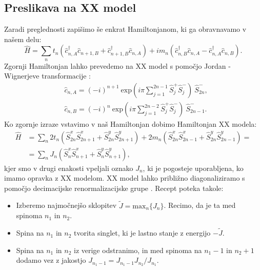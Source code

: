 \cleardoublepage
\renewcommand\appendixname{Dodatek}
\begin{appendices}
\chapter{Preslikava na XX model}
Zaradi preglednosti zapišimo še enkrat Hamiltonjanom, ki ga obravnavamo v našem delu:
\begin{equation}
\hat{H} = \sum_{n} t_n \left(\hat{c}_{n,A}^\dagger \hat{c}_{n+1, B} + \hat{c}^\dagger_{n+1,B} \hat{c}_{n,A} \right) + im_n \left( \hat{c}^\dagger_{n,B} \hat{c}_{n,A} - \hat{c}^\dagger_{n,A}\hat{c}_{n,B}   \right).
\end{equation}
Zgornji Hamiltonjan lahko prevedemo na XX model s pomočjo Jordan - Wignerjeve transformacije \cite{mondragon}:
\begin{align}
&\hat{c}_{n,A} = (-i)^{n+1}\  \mathrm{exp}(i \pi \sum_{j=1}^{2n-1} \hat{S}_j^+ \hat{S}_j^-)\ \hat{S}_{2n}^-,\\
&\hat{c}_{n,B} = (-i)^n \ \mathrm{exp}(i \pi \sum_{j=1}^{2n-2} \hat{S}_j^+ \hat{S}_j^-) \ \hat{S}^-_{2n-1}.
\end{align}
Ko zgornje izraze vstavimo v naš Hamiltonjan dobimo Hamiltonjan XX modela:
\begin{align}
\hat{H} &= \sum_n 2 t_n ( \hat{S}^x_{2n} \hat{S}^x_{2n+1} + \hat{S}^y_{2n} \hat{S}^y_{2n+1}) + 2m_n (\hat{S}^x_{2n} \hat{S}^x_{2n-1} + \hat{S}^y_{2n} \hat{S}^y_{2n-1}) = \\
&= \sum_n J_n (\hat{S}^x_n \hat{S}^x_{n+1} + \hat{S}^y_n \hat{S}^y_{n+1}),
\end{align}
kjer smo v drugi enakosti vpeljali oznako $J_n$, ki je pogosteje uporabljena, ko imamo opravka z XX modelom.  
XX model lahko približno diagonaliziramo s pomočjo decimacijske renormalizacijske grupe \cite{rg}.
Recept poteka takole:
\begin{itemize} 
\item Izberemo najmočnejšo sklopitev $\tilde{J} = \mathrm{max}_n \{ J_n \}$. Recimo, da je ta med spinoma $n_1$ in $n_2$.
\item Spina na $n_1$ in $n_2$ tvorita singlet, ki je lastno stanje z energijo $-\tilde{J}$. 
\item Spina na $n_1$ in $n_2$ iz verige odstranimo, in med spinoma na $n_1-1$ in $n_2+1$ dodamo vez z jakostjo $J_{n_1-1} = J_{n_1-1} J_{n_2} / J_{n_1}$.
\end{itemize}


\end{appendices}
